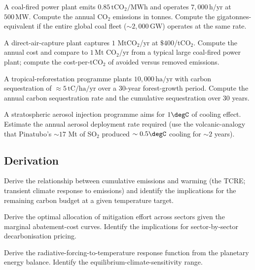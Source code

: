 \begin{exercise}
A coal-fired power plant emits $0.85\,\text{tCO}_2/\text{MWh}$ and operates $7{,}000\,\text{h/yr}$ at $500\,\text{MW}$. Compute the annual CO$_2$ emissions in tonnes. Compute the gigatonnes-equivalent if the entire global coal fleet ($\sim 2{,}000\,\text{GW}$) operates at the same rate.
\end{exercise}

\begin{exercise}
A direct-air-capture plant captures $1$ MtCO$_2$/yr at $\$400$/tCO$_2$. Compute the annual cost and compare to $1\,\text{Mt CO}_2$/yr from a typical large coal-fired power plant; compute the cost-per-tCO$_2$ of avoided versus removed emissions.
\end{exercise}

\begin{exercise}
A tropical-reforestation programme plants $10{,}000\,\text{ha/yr}$ with carbon sequestration of $\approx 5\,\text{tC/ha/yr}$ over a $30$-year forest-growth period. Compute the annual carbon sequestration rate and the cumulative sequestration over $30$ years.
\end{exercise}

\begin{exercise}
A stratospheric aerosol injection programme aims for $1\degC$ of cooling effect. Estimate the annual aerosol deployment rate required (use the volcanic-analogy that Pinatubo's $\sim 17$ Mt of SO$_2$ produced $\sim 0.5\degC$ cooling for $\sim 2$ years).
\end{exercise}

\subsection*{Derivation}

\begin{exercise}
Derive the relationship between cumulative emissions and warming (the TCRE; transient climate response to emissions) and identify the implications for the remaining carbon budget at a given temperature target.
\end{exercise}

\begin{exercise}
Derive the optimal allocation of mitigation effort across sectors given the marginal abatement-cost curves. Identify the implications for sector-by-sector decarbonisation pricing.
\end{exercise}

\begin{exercise}
Derive the radiative-forcing-to-temperature response function from the planetary energy balance. Identify the equilibrium-climate-sensitivity range.
\end{exercise}

